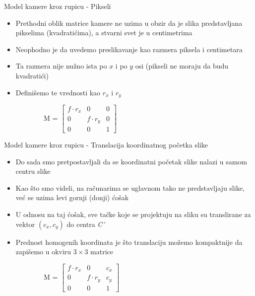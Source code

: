 \documentclass[bookmarks=true,bookmarksopen=true,pdfborder={0 0 0},pdfhighlight={/N},linkbordercolor={.5 .5 .5},implicit=false,unicode,xcolor={table}]{beamer}
\begin{document}
\begin{frame}{Model kamere kroz rupicu - Pikseli}

  \begin{itemize}
    \item Prethodni oblik matrice kamere ne uzima u obzir da je slika predstavljana pikselima (kvadratićima), 
    a stvarni svet je u centimetrima
    \item Neophodno je da uvedemo preslikavanje kao razmera piksela i centimetara
    \item Ta razmera nije nužno ista po $x$ i po $y$ osi (pikseli ne moraju da budu kvadratići)
    \item Definišemo te vrednosti kao $r_{x}$ i $r_{y}$
  \end{itemize}

  \begin{figure}
      \begin{subfigure}{4cm}
        M =
        $\begin{bmatrix}
          f\cdot r_{x} & 0 & 0\\
          0 & f\cdot r_{y} & 0\\
          0 & 0 & 1
        \end{bmatrix}$
      \end{subfigure}
    \end{figure}
\end{frame}

\begin{frame}{Model kamere kroz rupicu - Translacija koordinatnog početka slike}

  \begin{itemize}
    \item Do sada smo pretpostavljali da se koordinatni početak slike nalazi u samom centru slike
    \item Kao što smo videli, na računarima se uglavnom tako ne predstavljaju slike, već se uzima levi gornji (donji) ćošak
    \item U odnosu na taj ćošak, sve tačke koje se projektuju na sliku su translirane za vektor $(c_{x}, c_{y})$ do centra \textit{C'}
    \item Prednost homogenih koordinata je što translaciju možemo kompaktnije da zapišemo u okviru $3 \times 3$ matrice
  \end{itemize}

  \begin{figure}
      \begin{subfigure}{4cm}
        M =
        $\begin{bmatrix}
          f\cdot r_{x} & 0 & c_{x}\\
          0 & f\cdot r_{y} & c_{y}\\
          0 & 0 & 1
        \end{bmatrix}$
      \end{subfigure}
    \end{figure}
\end{frame}
\end{document}
